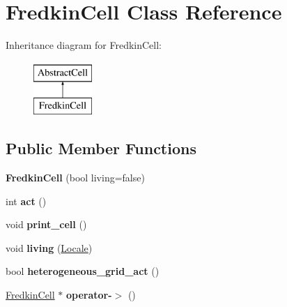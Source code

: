 \hypertarget{classFredkinCell}{\section{Fredkin\-Cell Class Reference}
\label{classFredkinCell}
}
Inheritance diagram for Fredkin\-Cell\-:\begin{figure}[H]
\begin{center}
\leavevmode
\includegraphics[height=2.000000cm]{classFredkinCell}
\end{center}
\end{figure}
\subsection*{Public Member Functions}
\begin{DoxyCompactItemize}
\item 
\hypertarget{classFredkinCell_a10a38c451ddc914d833969289cbd7b07}{{\bfseries Fredkin\-Cell} (bool living=false)}\label{classFredkinCell_a10a38c451ddc914d833969289cbd7b07}

\item 
\hypertarget{classFredkinCell_a06443820d9015c235297bff1c7275562}{int {\bfseries act} ()}\label{classFredkinCell_a06443820d9015c235297bff1c7275562}

\item 
\hypertarget{classFredkinCell_aaea67599210c77e6a57695aa8cb3c15a}{void {\bfseries print\-\_\-cell} ()}\label{classFredkinCell_aaea67599210c77e6a57695aa8cb3c15a}

\item 
\hypertarget{classFredkinCell_ac99c9fe832682b2bb95a19c44c84bfb6}{void {\bfseries living} (\hyperlink{structLocale}{Locale})}\label{classFredkinCell_ac99c9fe832682b2bb95a19c44c84bfb6}

\item 
\hypertarget{classFredkinCell_a1249a32202e5b1b5188f25087a082ac6}{bool {\bfseries heterogeneous\-\_\-grid\-\_\-act} ()}\label{classFredkinCell_a1249a32202e5b1b5188f25087a082ac6}

\item 
\hypertarget{classFredkinCell_a743df8596f94d55aceeb96d35377d67b}{\hyperlink{classFredkinCell}{Fredkin\-Cell} $\ast$ {\bfseries operator-\/$>$} ()}\label{classFredkinCell_a743df8596f94d55aceeb96d35377d67b}

\end{DoxyCompactItemize}
